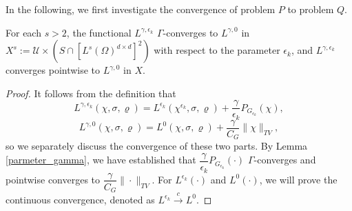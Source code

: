 \documentclass{amsart}
\begin{document}
In the following, we first investigate the convergence of problem $P$ to problem $Q$.
\begin{theorem}\label{P_star_Q}
    For each $s>2$, the functional \( L^{\gamma,\epsilon_k} \) \(\Gamma\)-converges to \( L^{\gamma,0} \) in $X^s:=\mathcal{U}\times(S\cap [L^s(\Omega)^{d\times d}]^2)$ with respect to the parameter \(\epsilon_k\), and \( L^{\gamma,\epsilon_k} \) converges pointwise to \( L^{\gamma,0} \) in $X$.
\end{theorem}
\begin{proof}
    It follows from the definition that
    $$L^{\gamma,\epsilon_k}(\chi,\sigma,\varrho)=L^{\epsilon_k}(\chi^{\epsilon_k},\sigma,\varrho)+\dfrac{\gamma}{\epsilon_k}P_{G_{\epsilon_k}}(\chi),$$
    $$L^{\gamma,0}(\chi,\sigma,\varrho)=L^0(\chi,\sigma,\varrho)+\dfrac{\gamma}{C_G}\|\chi\|_{TV},$$
    so we separately discuss the convergence of these two parts. By Lemma \ref{parmeter_gamma}, we have established that \( \dfrac{\gamma}{\epsilon_k}P_{G_{\epsilon_k}}(\cdot) \) \(\Gamma\)-converges and pointwise converges to \(\dfrac{\gamma}{C_G}\|\cdot\|_{TV}\). For $L^{\epsilon_k}(\cdot)$ and $L^0(\cdot)$, we will prove the continuous convergence, denoted as $L^{\epsilon_k}\stackrel{c}{\longrightarrow}L^0 $.


\end{proof}
\end{document}
